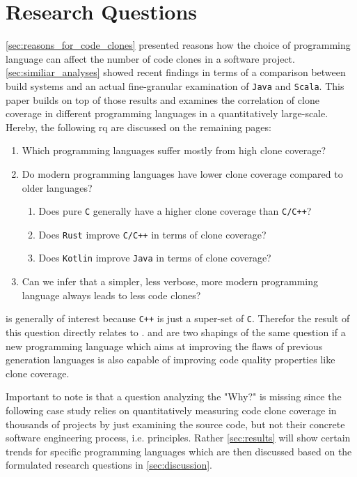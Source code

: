 
\section{Research Questions}
\label{sec:research_question}

\autoref{sec:reasons_for_code_clones} presented reasons how the choice of programming language can affect the number of code clones in a software project. \autoref{sec:similiar_analyses} showed recent findings in terms of a comparison between build systems and an actual fine-granular examination of \texttt{Java} and \texttt{Scala}.
This paper builds on top of those results and examines the correlation of clone coverage in different programming languages in a quantitatively large-scale. Hereby, the following \ac{rq} are discussed on the remaining pages:

\begin{enumerate}
	\item Which programming languages suffer mostly from high clone coverage? \label{question:clone_coverage_comparison}
	\item Do modern programming languages have lower clone coverage compared to older languages? \label{question:comparing_age}
	\begin{enumerate}
		\item Does pure \texttt{C} generally have a higher clone coverage than \texttt{C/C++}? \label{question:compare_c_cpp}
		\item Does \texttt{Rust} improve \texttt{C/C++} in terms of clone coverage? \label{question:compare_rust_c}
		\item Does \texttt{Kotlin} improve \texttt{Java} in terms of clone coverage? \label{question:compare_kotlin_java}
	\end{enumerate}
	\item Can we infer that a simpler, less verbose, more modern programming language always leads to less code clones? \label{question:always_less_clones}
\end{enumerate}

 is generally of interest because \texttt{C++} is just a super-set of \texttt{C}. Therefor the result of this question directly relates to .  and  are two shapings of the same question if a new programming language which aims at improving the flaws of previous generation languages is also capable of improving code quality properties like clone coverage.

Important to note is that a question analyzing the "Why?" is missing since the following case study relies on quantitatively measuring code clone coverage in thousands of projects by just examining the source code, but not their concrete software engineering process, i.e. principles. Rather \autoref{sec:results} will show certain trends for specific programming languages which are then discussed based on the formulated research questions in \autoref{sec:discussion}.